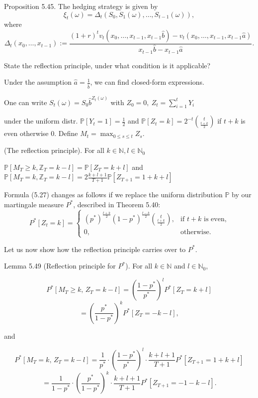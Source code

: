 Proposition 5.45. The hedging strategy is given by
\[
\xi_t(\omega) = \Delta_t(S_0, S_1(\omega), \ldots, S_{t-1}(\omega)),
\]
where
\[
\Delta_t(x_0, \ldots, x_{t-1}) := \frac{(1+r)^t v_t(x_0, \ldots, x_{t-1}, x_{t-1}\hat{b}) - v_t(x_0, \ldots, x_{t-1}, x_{t-1}\hat{a})}{x_{t-1}\hat{b} - x_{t-1}\hat{a}}.
\]



State the reflection principle, under what condition is it applicable?

Under the assumption \( \hat{a} = \frac{1}{\hat{b}} \), we can find closed-form expressions.

One can write
\( S_t(\omega) = S_0 \hat{b}^{Z_t(\omega)} \) with \( Z_0 = 0, \ Z_t = \sum_{i=1}^t Y_i \)

under the uniform distr. \( \mathbb{P}[Y_t = 1] = \frac{1}{2} \) and
\( \mathbb{P}[Z_t = k] = 2^{-t}\binom{t}{\frac{t+k}{2}} \) if \( t + k \) is even
otherwise \( 0 \). Define \( M_t = \max_{0 \leq s \leq t} Z_s \).

(The reflection principle).
For all \( k \in \mathbb{N}, l \in \mathbb{N}_0 \) 

\( \mathbb{P}[M_T \geq k, \mathbb{Z}_T = k - l] = \mathbb{P}[Z_T = k + l] \)
and 
\( \mathbb{P}[M_T = k, \mathbb{Z}_T = k - l] = 2\frac{k + l + 1}{T + 1}\mathbb{P}[Z_{T+1} = 1 + k + l] \)


Formula (5.27) changes as follows if we replace the uniform distribution \( \mathbb{P} \) by our martingale measure \( P^* \), 
described in Theorem 5.40:
\[
P^*[Z_t = k] = 
\begin{cases} 
(p^*)^{\frac{t+k}{2}} (1-p^*)^{\frac{t-k}{2}} \binom{t}{\frac{t+k}{2}}, & \text{if } t+k \text{ is even,} \\ 
0, & \text{otherwise.} 
\end{cases}
\]

Let us now show how the reflection principle carries over to \( P^* \).

Lemma 5.49 (Reflection principle for \( P^* \)). For all \( k \in \mathbb{N} \) and \( l \in \mathbb{N}_0 \),

\[
P^*[M_T \geq k, \, Z_T = k-l] = \left( \frac{1-p^*}{p^*} \right)^l P^*[Z_T = k+l]
\]
\[
= \left( \frac{p^*}{1-p^*} \right)^k P^*[Z_T = -k-l],
\]

and

\[
P^*[M_T = k, \, Z_T = k-l]
= \frac{1}{p^*} \cdot \left( \frac{1-p^*}{p^*} \right)^l \cdot \frac{k+l+1}{T+1} P^*[Z_{T+1} = 1+k+l]
\]
\[
= \frac{1}{1-p^*} \cdot \left( \frac{p^*}{1-p^*} \right)^k \cdot \frac{k+l+1}{T+1} P^*[Z_{T+1} = -1-k-l].
\]



